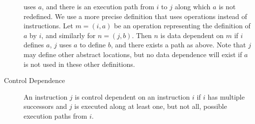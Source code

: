 \documentclass[12pt,titlepage]{article}
\begin{document}
\begin{description}
  uses $a$, and there is an execution path from $i$ to $j$ along which
  $a$ is not redefined. We use a more precise definition that uses
  operations instead of instructions. Let $m = (i,a)$ be an operation
  representing the definition of $a$ by $i$, and similarly for $n =
  (j, b)$. Then $n$ is data dependent on $m$ if $i$ defines $a$, $j$
  uses $a$ to define $b$, and there exists a path as above. Note that
  $j$ may define other abstract locations, but no data dependence will
  exist if $a$ is not used in these other definitions.
\item[Control Dependence] An instruction $j$ is control dependent on
  an instruction $i$ if $i$ has multiple successors and $j$ is
  executed along at least one, but not all, possible execution paths
  from $i$.

\end{description}
\end{document}
